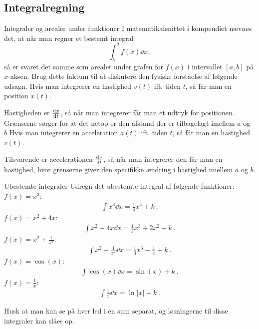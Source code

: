 \subsection*{Integralregning}
\begin{opgave}[1]{Integraler og arealer under funktioner}
I matematikafsnittet i kompendiet nævnes det, at når man regner et bestemt integral
\begin{equation*}
\int^a_b{f(x)}\dd{x},
\end{equation*}
så er svaret det samme som arealet under grafen for $f(x)$ i intervallet $[a,b]$ på $x$-aksen. Brug dette faktum til at diskutere den fysiske forståelse af følgende udsagn.
\opg Hvis man integrerer en hastighed $v(t)$ ift. tiden $t$, så får man en position $x(t)$.

Hastigheden er $\dv{x}{t}$, så når man integrerer får man et udtryk for positionen. Grænserne sørger for at det netop er den afstand der er tilbagelagt imellem $a$ og $b$
\opg Hvis man integrerer en acceleration $a(t)$ ift. tiden $t$, så får man en hastighed $v(t)$. 

Tilsvarende er accelerationen $\dv{v}{t}$, så når man integrerer den får man en hastighed, hvor grenserne giver den specifikke ændring i hastighed imellem $a$ og $b$.
\end{opgave}

\begin{opgave}[1]{Ubestemte integraler}
	Udregn det ubestemte integral af følgende funktioner:
	\opg $f(x) = x^3$:
    	\begin{align*}
    	    \int x^3\dd{x}=\frac{1}{4}x^4+k \: .
    	\end{align*}
	\opg $f(x) = x^2 + 4x$:
    	\begin{align*}
    	    \int x^2+4x\dd{x}=\frac{1}{3}x^3+2x^2+k \: .
    	\end{align*}
	\opg $f(x) = x^2 + \frac{1}{x^2}$:
	    \begin{align*}
	        \int x^2+\frac{1}{x^2}\dd{x}=\frac{1}{3}x^3-\frac{1}{x}+k \: .
	    \end{align*}
	\opg $f(x) = \cos (x)$:
	    \begin{align*}
	        \int \cos(x)\dd{x}=\sin(x)+k \: .
	    \end{align*}
	\opg $f(x) = \frac{1}{x}$:
	    \begin{align*}
	        \int\frac{1}{x}\dd{x}=\ln|x|+k \: .
	    \end{align*}
    
    Husk at man kan se på hver led i en sum separat, og løsningerne til disse integraler kan slåes op.
\end{opgave}

